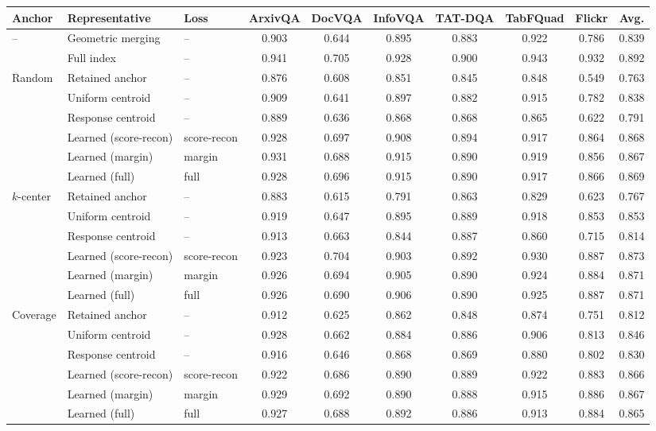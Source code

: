 \begin{tabular}{lllccccccc}
\toprule
Anchor & Representative & Loss & ArxivQA & DocVQA & InfoVQA & TAT-DQA & TabFQuad & Flickr & Avg. \\
\midrule
-- & Geometric merging & -- & 0.903 & 0.644 & 0.895 & 0.883 & 0.922 & 0.786 & 0.839 \\
 & Full index & -- & 0.941 & 0.705 & 0.928 & 0.900 & 0.943 & 0.932 & 0.892 \\
\midrule
Random & Retained anchor & -- & 0.876 & 0.608 & 0.851 & 0.845 & 0.848 & 0.549 & 0.763 \\
 & Uniform centroid & -- & 0.909 & 0.641 & 0.897 & 0.882 & 0.915 & 0.782 & 0.838 \\
 & Response centroid & -- & 0.889 & 0.636 & 0.868 & 0.868 & 0.865 & 0.622 & 0.791 \\
 & Learned (score-recon) & score-recon & 0.928 & 0.697 & 0.908 & 0.894 & 0.917 & 0.864 & 0.868 \\
 & Learned (margin) & margin & 0.931 & 0.688 & 0.915 & 0.890 & 0.919 & 0.856 & 0.867 \\
 & Learned (full) & full & 0.928 & 0.696 & 0.915 & 0.890 & 0.917 & 0.866 & 0.869 \\
\midrule
$k$-center & Retained anchor & -- & 0.883 & 0.615 & 0.791 & 0.863 & 0.829 & 0.623 & 0.767 \\
 & Uniform centroid & -- & 0.919 & 0.647 & 0.895 & 0.889 & 0.918 & 0.853 & 0.853 \\
 & Response centroid & -- & 0.913 & 0.663 & 0.844 & 0.887 & 0.860 & 0.715 & 0.814 \\
 & Learned (score-recon) & score-recon & 0.923 & 0.704 & 0.903 & 0.892 & 0.930 & 0.887 & 0.873 \\
 & Learned (margin) & margin & 0.926 & 0.694 & 0.905 & 0.890 & 0.924 & 0.884 & 0.871 \\
 & Learned (full) & full & 0.926 & 0.690 & 0.906 & 0.890 & 0.925 & 0.887 & 0.871 \\
\midrule
Coverage & Retained anchor & -- & 0.912 & 0.625 & 0.862 & 0.848 & 0.874 & 0.751 & 0.812 \\
 & Uniform centroid & -- & 0.928 & 0.662 & 0.884 & 0.886 & 0.906 & 0.813 & 0.846 \\
 & Response centroid & -- & 0.916 & 0.646 & 0.868 & 0.869 & 0.880 & 0.802 & 0.830 \\
 & Learned (score-recon) & score-recon & 0.922 & 0.686 & 0.890 & 0.889 & 0.922 & 0.883 & 0.866 \\
 & Learned (margin) & margin & 0.929 & 0.692 & 0.890 & 0.888 & 0.915 & 0.886 & 0.867 \\
 & Learned (full) & full & 0.927 & 0.688 & 0.892 & 0.886 & 0.913 & 0.884 & 0.865 \\
\bottomrule
\end{tabular}